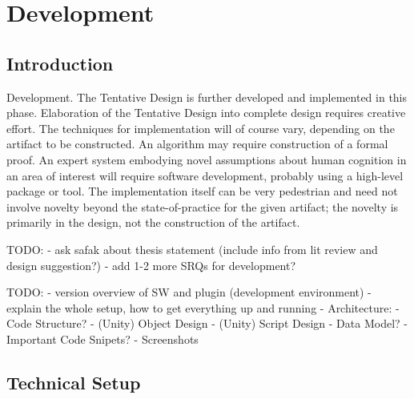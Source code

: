 
\chapter{Development}

\label{ChapterDevelopment}


\section{Introduction}

Development. The Tentative Design is further developed and implemented in this phase. Elaboration of the Tentative Design into complete design requires creative effort. The techniques for implementation will of course vary, depending on the artifact to be constructed. An algorithm may require construction of a formal proof. An expert system embodying novel assumptions about human cognition in an area of interest will require software development, probably using a high-level package or tool. The implementation itself can be very pedestrian and need not involve novelty beyond the state-of-practice for the given artifact; the novelty is primarily in the design, not the construction of the artifact.
\cite{Vaishnavi2008}


TODO:
- ask safak about thesis statement (include info from lit review and design suggestion?)
- add 1-2 more SRQs for development?

TODO:
- version overview of SW and plugin (development environment)
- explain the whole setup, how to get everything up and running
- Architecture:
- Code Structure?
- (Unity) Object Design
- (Unity) Script Design
- Data Model?
- Important Code Snipets?
- Screenshots



\section{Technical Setup}

